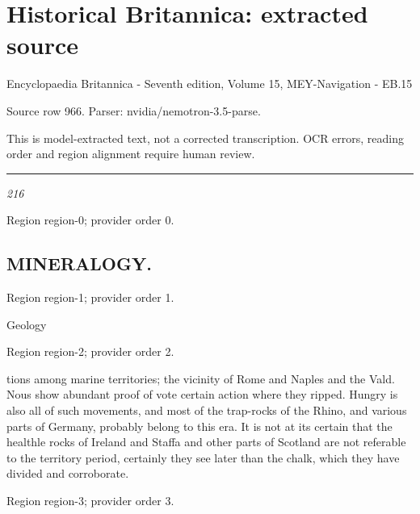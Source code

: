 \documentclass[11pt]{article}
\begin{document}
\section*{Historical Britannica: extracted source}
Encyclopaedia Britannica - Seventh edition, Volume 15, MEY-Navigation - EB.15\par
{\small Source row 966. Parser: nvidia/nemotron-3.5-parse.\par}
{\small This is model-extracted text, not a corrected transcription. OCR errors, reading order and region alignment require human review.\par}
\hrule\medskip
{\small\itshape 216\par}

{\scriptsize\color{gray} Region region-0; provider order 0.\par}
\medskip

\subsection*{MINERALOGY.}

{\scriptsize\color{gray} Region region-1; provider order 1.\par}
\medskip

Geology
\par

{\scriptsize\color{gray} Region region-2; provider order 2.\par}
\medskip

tions among marine territories; the vicinity of Rome and Naples and the Vald. Nous show abundant proof of vote certain action where they ripped. Hungry is also all of such movements, and most of the trap-rocks of the Rhino, and various parts of Germany, probably belong to this era. It is not at its certain that the healthle rocks of Ireland and Staffa and other parts of Scotland are not referable to the territory period, certainly they see later than the chalk, which they have divided and corroborate.
\par

{\scriptsize\color{gray} Region region-3; provider order 3.\par}
\medskip
\end{document}
